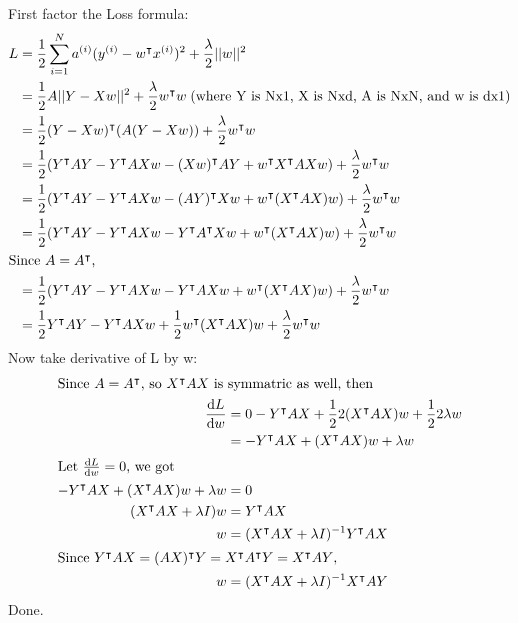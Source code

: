 \documentclass{article}
\begin{document}
\section{}
\subsection{}
First factor the Loss formula:
\begin{align*}
    L &= \frac{1}{2}\sum_{i = 1}^{N} a^{(i)} (y^{(i)} - w^\intercal x^{(i)} )^2 + \frac{\lambda}{2}||w||^2 \\
    &= \frac{1}{2}A||Y-Xw||^2 + \frac{\lambda}{2}w^\intercal w \; \text{(where Y is Nx1, X is Nxd, A is NxN, and w is dx1)}\\
    &= \frac{1}{2}(Y-Xw)^\intercal (A(Y-Xw)) + \frac{\lambda}{2}w^\intercal w\\
    &= \frac{1}{2}(Y^\intercal AY-Y^\intercal AXw -(Xw)^\intercal AY + w^\intercal X^\intercal AXw) + \frac{\lambda}{2}w^\intercal w\\
    &= \frac{1}{2}(Y^\intercal AY-Y^\intercal AXw - (AY)^\intercal Xw + w^\intercal (X^\intercal AX)w) + \frac{\lambda}{2}w^\intercal w\\
    &= \frac{1}{2}(Y^\intercal AY-Y^\intercal AXw - Y^\intercal A^\intercal Xw + w^\intercal (X^\intercal AX)w) + \frac{\lambda}{2}w^\intercal w\\
\intertext{Since $A = A^\intercal$,}
    &= \frac{1}{2}(Y^\intercal AY-Y^\intercal AXw - Y^\intercal AXw + w^\intercal (X^\intercal AX)w) + \frac{\lambda}{2}w^\intercal w\\
    &= \frac{1}{2}Y^\intercal AY-Y^\intercal AXw + \frac{1}{2}w^\intercal (X^\intercal AX)w + \frac{\lambda}{2}w^\intercal w\\
\end{align*}
Now take derivative of L by w:
\begin{align*}
\intertext{Since $A = A^\intercal$, so $X^\intercal AX$ is symmatric as well, then}
    \frac{\mathrm{d} L}{\mathrm{d} w} &= 0-Y^\intercal AX + \frac{1}{2}2(X^\intercal AX)w + \frac{1}{2}2\lambda w\\
    &= -Y^\intercal AX  + (X^\intercal AX)w + \lambda w\\
\intertext{Let $\frac{\mathrm{d} L}{\mathrm{d} w} = 0$, we got}
-Y^\intercal AX  + (X^\intercal AX)w + \lambda w &= 0\\
(X^\intercal AX + \lambda I)w &= Y^\intercal AX\\
w &= (X^\intercal AX + \lambda I)^{-1}Y^\intercal AX\\
\intertext{Since $Y^\intercal AX = (AX)^\intercal Y = X^\intercal A^\intercal Y = X^\intercal A Y$,}
w &= (X^\intercal AX + \lambda I)^{-1}X^\intercal AY\\
\end{align*}
Done.
\end{document}
